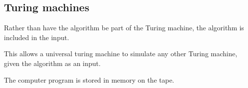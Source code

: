 
\subsection{Turing machines}

Rather than have the algorithm be part of the Turing machine, the algorithm is included in the input.

This allows a universal turing machine to simulate any other Turing machine, given the algorithm as an input.

The computer program is stored in memory on the tape.


